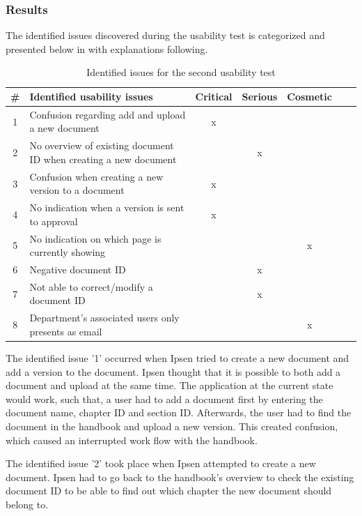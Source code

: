 \subsubsection*{Results}
The identified issues discovered during the usability test is categorized and presented below in  with explanations following.

\begin{table}[H]
	\begin{center}
	\begin{tabular}{| c | m{21em} | c | c | c | c | c |}
		\hline
		\# & \textbf{Identified usability issues} & Critical  & Serious & Cosmetic \\
		\hline
		 1 & Confusion regarding add and upload a new document   & x &  &  \\
		\hline
		 2 & No overview of existing document ID when creating a new document &  & x & \\
		\hline
		 3 & Confusion when creating a new version to a document & x & &  \\
		\hline
		4 & No indication when a version is sent to approval & x & & \\
		\hline
		5 & No indication on which page is currently showing &  &  & x \\
		\hline
		6 & Negative document ID &  & x & \\
		\hline
		7 & Not able to correct/modify a document ID & & x &  \\
		\hline
		8 & Department's associated users only presents as email &  &  & x \\
		\hline
	\end{tabular}
	\end{center}
	\caption{Identified issues for the second usability test}\label{tab:utest2}
\end{table}
The identified issue '1' occurred when Ipsen tried to create a new document and add a version to the document.
Ipsen thought that it is possible to both add a document and upload at the same time.
The application at the current state would work, such that, a user had to add a document first by entering the document name, chapter ID and section ID.
Afterwards, the user had to find the document in the handbook and upload a new version.
This created confusion, which caused an interrupted work flow with the handbook.

The identified issue '2' took place when Ipsen attempted to create a new document.
Ipsen had to go back to the handbook's overview to check the existing document ID to be able to find out which chapter the new document should belong to.

